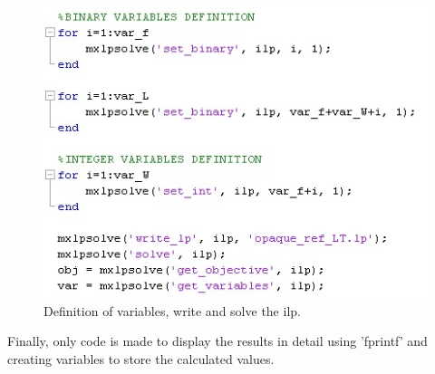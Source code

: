 \begin{figure}[h!]
\centering
\includegraphics[width=\textwidth]{appendices/lpsolve/figures/five_step}
\caption{Definition of variables, write and solve the ilp.}
\label{five_step}
\end{figure}

Finally, only code is made to display the results in detail using 'fprintf' and creating variables to store the calculated values.\\

